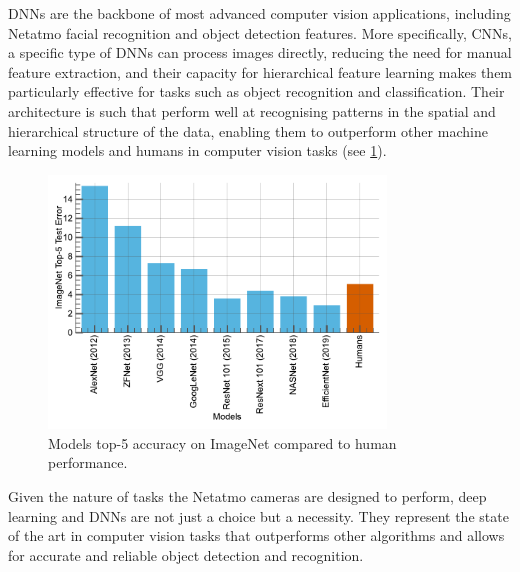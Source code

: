 \acp{DNN} are the backbone of most advanced computer vision applications,
including Netatmo facial recognition and object detection features. More
specifically, \acp{CNN}, a specific type of \acp{DNN} can process images
directly, reducing the need for manual feature extraction, and their capacity
for hierarchical feature learning makes them particularly effective for tasks
such as object recognition and classification. Their architecture is such that
perform well at recognising patterns in the spatial and hierarchical structure
of the data, enabling them to outperform other machine learning models and
humans in computer vision tasks (see \cref{fig:intro:models_vs_humans}).\\

\begin{figure}[htbp]
    \centering
    \includegraphics[width=0.8\textwidth]{chapter_intro/assets/models_vs_human.pdf}
    \caption{Models top-5 accuracy on ImageNet \cite{deng2009imagenet} compared
        to human performance.}
    \label{fig:intro:models_vs_humans}
\end{figure}

Given the nature of tasks the Netatmo cameras are designed to perform, deep
learning and \aclp{DNN} are not just a choice but a necessity. They represent
the state of the art in computer vision tasks that outperforms other algorithms
and allows for accurate and reliable object detection and recognition.\\



